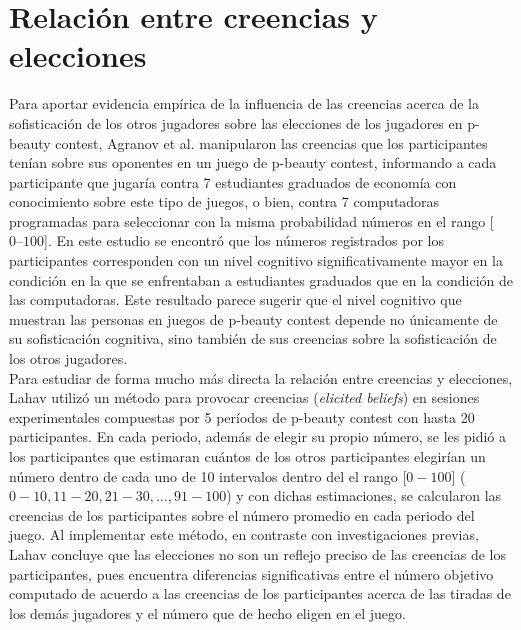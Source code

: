\section{Relación entre creencias y elecciones}

Para aportar evidencia empírica de la influencia de las creencias acerca de la sofisticación de los otros jugadores sobre las elecciones de los jugadores en p-beauty contest, Agranov et al. \parencite*{Agranov2012} manipularon las creencias que los participantes tenían sobre sus oponentes en un juego de p-beauty contest, informando a cada participante que jugaría contra 7 estudiantes graduados de economía con conocimiento sobre este tipo de juegos, o bien, contra 7 computadoras programadas para seleccionar con la misma probabilidad  números en el rango [$0 – 100$]. En este estudio se encontró que los números registrados por los participantes corresponden con un nivel cognitivo significativamente mayor en la condición en la que se enfrentaban a estudiantes graduados que en la condición de las computadoras. Este resultado parece sugerir que el nivel cognitivo que muestran las personas en juegos de p-beauty contest depende no únicamente de su sofisticación cognitiva, sino también de sus creencias sobre la sofisticación de los otros jugadores.\\

Para estudiar de forma mucho más directa la relación entre creencias y elecciones, Lahav \parencite*{Lahav2015} utilizó un método para provocar creencias (\textit{elicited beliefs}) en sesiones experimentales compuestas por 5 períodos de p-beauty contest con hasta 20 participantes. En cada periodo, además de elegir su propio número, se les pidió a los participantes que estimaran cuántos de los otros participantes elegirían un número dentro de cada uno de 10 intervalos dentro del el rango [$0-100$] ($0-10, 11-20, 21-30, …, 91-100$) y con dichas estimaciones, se calcularon las creencias de los participantes sobre el número promedio en cada periodo del juego. Al implementar este método, en contraste con investigaciones previas, Lahav concluye que las elecciones no son un reflejo preciso de las creencias de los participantes, pues encuentra diferencias significativas entre el número objetivo computado de acuerdo a las creencias de los participantes acerca de las tiradas de los demás jugadores y el número que de hecho eligen en el juego.\\

